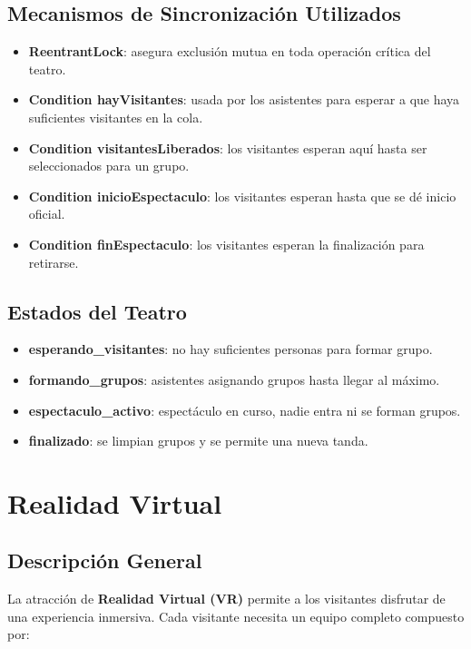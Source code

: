 \documentclass[12pt,a4paper]{article}
\begin{document}
\subsection{Mecanismos de Sincronización Utilizados}

\begin{itemize}
    \item \textbf{ReentrantLock}: asegura exclusión mutua en toda operación crítica del teatro.
    \item \textbf{Condition hayVisitantes}: usada por los asistentes para esperar a que haya suficientes visitantes en la cola.
    \item \textbf{Condition visitantesLiberados}: los visitantes esperan aquí hasta ser seleccionados para un grupo.
    \item \textbf{Condition inicioEspectaculo}: los visitantes esperan hasta que se dé inicio oficial.
    \item \textbf{Condition finEspectaculo}: los visitantes esperan la finalización para retirarse.
\end{itemize}

\subsection{Estados del Teatro}

\begin{itemize}
    \item \textbf{esperando\_visitantes}: no hay suficientes personas para formar grupo.
    \item \textbf{formando\_grupos}: asistentes asignando grupos hasta llegar al máximo.
    \item \textbf{espectaculo\_activo}: espectáculo en curso, nadie entra ni se forman grupos.
    \item \textbf{finalizado}: se limpian grupos y se permite una nueva tanda.
\end{itemize}



\newpage
\section{Realidad Virtual}

\subsection{Descripción General}
La atracción de \textbf{Realidad Virtual (VR)} permite a los visitantes disfrutar de una experiencia inmersiva. Cada visitante necesita un equipo completo compuesto por:
\end{document}
